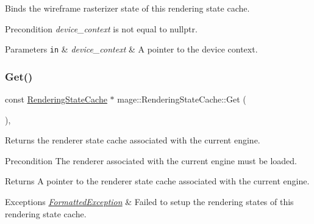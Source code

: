 Binds the wireframe rasterizer state of this rendering state cache.

\begin{DoxyPrecond}{Precondition}
{\itshape device\+\_\+context} is not equal to {\ttfamily nullptr}. 
\end{DoxyPrecond}

\begin{DoxyParams}[1]{Parameters}
\mbox{\tt in}  & {\em device\+\_\+context} & A pointer to the device context. \\
\hline
\end{DoxyParams}
\hypertarget{structmage_1_1_rendering_state_cache_a6523b7a2b99936bf307f7982c80b580f}{}\label{structmage_1_1_rendering_state_cache_a6523b7a2b99936bf307f7982c80b580f} 
\subsubsection{\texorpdfstring{Get()}{Get()}}
{\footnotesize\ttfamily const \hyperlink{structmage_1_1_rendering_state_cache}{Rendering\+State\+Cache} $\ast$ mage\+::\+Rendering\+State\+Cache\+::\+Get (\begin{DoxyParamCaption}{ }\end{DoxyParamCaption})\hspace{0.3cm}{\ttfamily [static]}, {\ttfamily [noexcept]}}

Returns the renderer state cache associated with the current engine.

\begin{DoxyPrecond}{Precondition}
The renderer associated with the current engine must be loaded. 
\end{DoxyPrecond}
\begin{DoxyReturn}{Returns}
A pointer to the renderer state cache associated with the current engine. 
\end{DoxyReturn}

\begin{DoxyExceptions}{Exceptions}
{\em \hyperlink{structmage_1_1_formatted_exception}{Formatted\+Exception}} & Failed to setup the rendering states of this rendering state cache. \\
\hline
\end{DoxyExceptions}
\hypertarget{structmage_1_1_rendering_state_cache_ab88f3e29706626a6a33c49c6bc7d8d33}{}\label{structmage_1_1_rendering_state_cache_ab88f3e29706626a6a33c49c6bc7d8d33} 
